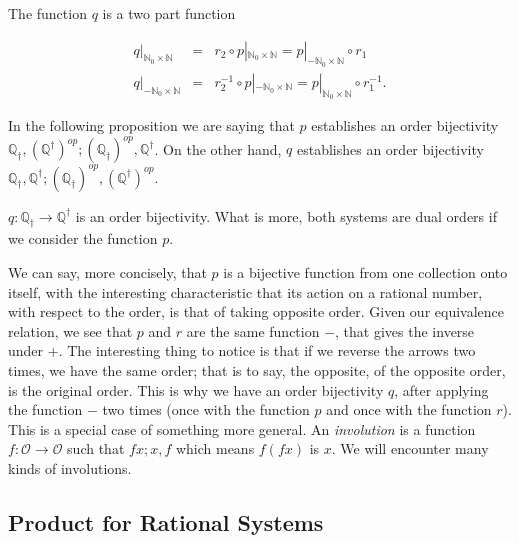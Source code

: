 \documentclass [12pt]{book}
\begin{document}
\begin{proposition}The function $q$ is a two part function

\begin{eqnarray}\nonumber q|_{\mathbb N_0\times\mathbb N}&=&r_2\circ p|_{\mathbb N_0\times\mathbb N}=p|_{-\mathbb N_0\times\mathbb N}\circ r_1\\\nonumber q|_{-\mathbb N_0\times\mathbb N}&=&r^{-1}_2\circ p|_{-\mathbb N_0\times\mathbb N}=p|_{\mathbb N_0\times\mathbb N}\circ r^{-1}_1.\end{eqnarray}\end{proposition}

In the following proposition we are saying that $p$ establishes an order bijectivity $\mathbb Q_\dagger,(\mathbb Q^{\dagger})^{op};(\mathbb Q_\dagger)^{op},\mathbb Q^\dagger$. On the other hand, $q$ establishes an order bijectivity $\mathbb Q_\dagger,\mathbb Q^\dagger;(\mathbb Q_\dagger)^{op},(\mathbb Q^\dagger)^{op}$.

\begin{proposition}$q:\mathbb Q_\dagger\rightarrow\mathbb Q^\dagger$ is an order bijectivity. What is more, both systems are dual orders if we consider the function $p$.\end{proposition}

We can say, more concisely, that $p$ is a bijective function from one collection onto itself, with the interesting characteristic that its action on a rational number, with respect to the order, is that of taking opposite order. Given our equivalence relation, we see that $p$ and $r$ are the same function $-$, that gives the inverse under $+$. The interesting thing to notice is that if we reverse the arrows two times, we have the same order; that is to say, the opposite, of the opposite order, is the original order. This is why we have an order bijectivity $q$, after applying the function $-$ two times (once with the function $p$ and once with the function $r$). This is a special case of something more general. An \textit{involution} is a function $f:\mathcal O\rightarrow\mathcal O$ such that $fx;x,f$ which means $f(fx)$ is $x$. We will encounter many kinds of involutions.



	\subsection{Product for Rational Systems}
\end{document}
